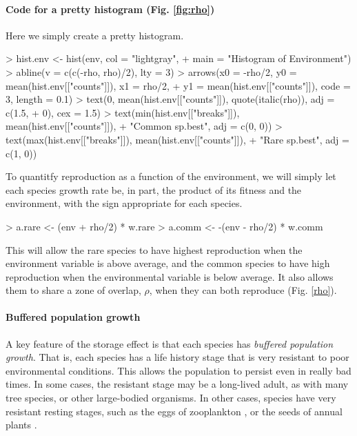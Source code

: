 \medskip \noindent
\begin{boxedminipage}{\linewidth}
  {\footnotesize
\paragraph{Code for a pretty histogram (Fig. \ref{fig:rho})} 
Here we simply create a pretty histogram.
\begin{Schunk}
\begin{Sinput}
> hist.env <- hist(env, col = "lightgray",
+                  main = "Histogram of Environment")
> abline(v = c(c(-rho, rho)/2), lty = 3)
> arrows(x0 = -rho/2, y0 = mean(hist.env[["counts"]]), x1 = rho/2, 
+     y1 = mean(hist.env[["counts"]]), code = 3, length = 0.1)
> text(0, mean(hist.env[["counts"]]), quote(italic(rho)), adj = c(1.5, 
+     0), cex = 1.5)
> text(min(hist.env[["breaks"]]), mean(hist.env[["counts"]]), 
+     "Common sp.\ngrows best", adj = c(0, 0))
> text(max(hist.env[["breaks"]]), mean(hist.env[["counts"]]), 
+     "Rare sp.\ngrows best", adj = c(1, 0))
\end{Sinput}
\end{Schunk}
}
\end{boxedminipage} \medskip

To quantitfy reproduction as a function of the environment, we will simply let each species growth rate be, in part, the product of its fitness and the environment, with the sign appropriate for each species.
\begin{Schunk}
\begin{Sinput}
> a.rare <- (env + rho/2) * w.rare
> a.comm <- -(env - rho/2) * w.comm
\end{Sinput}
\end{Schunk}
This will allow the rare species to have highest reproduction when the environment variable is above average, and the common species to have high reproduction when the environmental variable is below average. It also allows them to share a zone of overlap, $\rho$, when they can both reproduce (Fig. \ref{rho}).

\paragraph{Buffered population growth}
A key feature of the storage effect is that each species has \emph{buffered population growth}. That is, each species has a life history stage that is very resistant to poor environmental conditions. This allows the population to persist even in really bad times. In some cases, the resistant stage may be a long-lived adult, as with many tree species, or other large-bodied organisms. In other cases, species have very resistant resting stages, such as the eggs of zooplankton \cite{Caceres:1997zv}, or the seeds of annual plants \cite{Facelli:2005kc}. 

